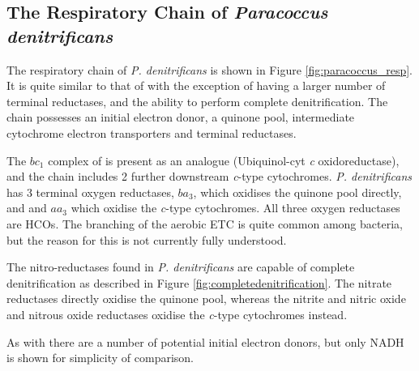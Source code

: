 \subsection{The Respiratory Chain of \textit{Paracoccus denitrificans}}
The respiratory chain of \textit{P. denitrificans} is shown in Figure \ref{fig:paracoccus_resp}. It is quite similar to that of \Nm{} with the exception of having a larger number of terminal reductases, and the ability to perform complete denitrification. The chain possesses an initial electron donor, a quinone pool, intermediate cytochrome electron transporters and terminal reductases.

The $bc_1$ complex of \Nm{} is present as an analogue (Ubiquinol-cyt \textit{c} oxidoreductase), and the chain includes 2 further downstream \textit{c}-type cytochromes. \textit{P. denitrificans} has 3 terminal oxygen reductases, $ba_3$, which oxidises the quinone pool directly, and \cbbthree{} and $aa_3$ which oxidise the \textit{c}-type cytochromes. All three oxygen reductases are HCOs. The branching of the aerobic ETC is quite common among bacteria, but the reason for this is not currently fully understood.

The nitro-reductases found in \textit{P. denitrificans} are capable of complete denitrification as described in Figure \ref{fig:completedenitrification}. The nitrate reductases directly oxidise the quinone pool, whereas the nitrite and nitric oxide and nitrous oxide reductases oxidise the \textit{c}-type cytochromes instead.

As with \Nm{} there are a number of potential initial electron donors, but only NADH is shown for simplicity of comparison.

